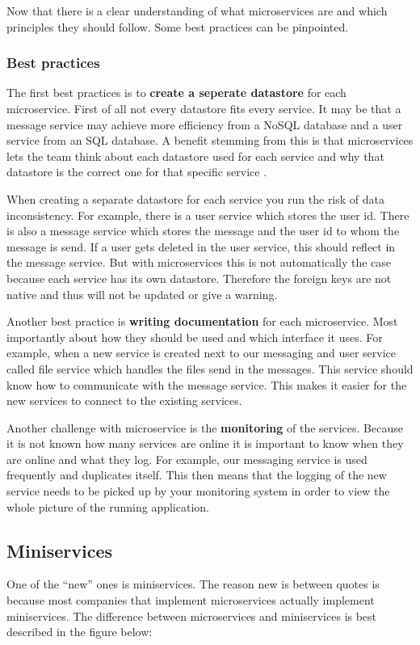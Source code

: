 Now that there is a clear understanding of what microservices are and which principles
they should follow. Some best practices can be pinpointed.

\subsubsection{Best practices}
The first best practices is to \textbf{create a seperate datastore} for each microservice. First of all not every datastore fits every service. It may be that a message service may achieve more efficiency from a NoSQL database and a user service from an SQL database. A benefit stemming from this is that microservices lets the team think about each datastore used for each service and why that datastore is the correct one for that specific service \cite{microservicesNetflix}.

When creating a separate datastore for each service you run the risk of data inconsistency. For example, there is a user service which stores the user id. There is also a message service which stores the message and the user id to whom the message is send. If a user gets deleted in the user service, this should reflect in the message service. But with microservices this is not automatically the case because each service has its own datastore. Therefore the foreign keys are not native and thus will not be updated or give a warning.

Another best practice is \textbf{writing documentation} \cite{microservicesBestPractice} for each microservice. Most importantly about how they should be used and which interface it uses. For example, when a new service is created next to our messaging and user service called file service which handles the files send in the messages. This service should know how to communicate with the message service. This makes it easier for the new services to connect to the existing services.

Another challenge with microservice is the \textbf{monitoring} \cite{microservicesBestPractice} of the services. Because it is not known how many services are online it is important to know when they are online and what they log. For example, our messaging service is used frequently and duplicates itself. This then means that the logging of the new service needs to be picked up by your monitoring system in order to view the whole picture of the running application.

\subsection{Miniservices}
One of the “new” ones is miniservices. The reason new is between quotes is because most companies that implement microservices actually implement miniservices. The difference between microservices and miniservices is best described in the figure below:

